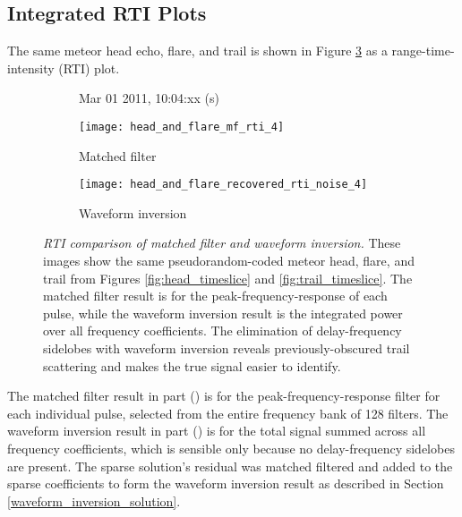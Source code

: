 \subsection{Integrated RTI Plots}
The same meteor head echo, flare, and trail is shown in Figure \ref{fig:mf_vs_recovered_rti} as a range-time-intensity (RTI) plot.
\begin{figure}[tpb]
 \vspace{-1.5\baselineskip}
 \begin{subfigure}{\textwidth}
  \centering
  \textsf{\footnotesize Mar 01 2011, 10:04:xx (s)}
  
  \texttt{[image: head\_and\_flare\_mf\_rti\_4]}
  \caption{Matched filter}
  \label{fig:example_mf_rti}
 \end{subfigure}
 
 \vspace{0.5\baselineskip}
 \begin{subfigure}{\textwidth}
  \centering
  \texttt{[image: head\_and\_flare\_recovered\_rti\_noise\_4]}
  \caption{Waveform inversion}
  \label{fig:example_recovered_rti}
 \end{subfigure}
 \caption[RTI comparison of matched filter and waveform inversion]{\emph{RTI comparison of matched filter and waveform inversion.} These images show the same pseudorandom-coded meteor head, flare, and trail from Figures \ref{fig:head_timeslice} and \ref{fig:trail_timeslice}. The matched filter result is for the peak-frequency-response of each pulse, while the waveform inversion result is the integrated power over all frequency coefficients. The elimination of delay-frequency sidelobes with waveform inversion reveals previously-obscured trail scattering and makes the true signal easier to identify.}
 \label{fig:mf_vs_recovered_rti}
\end{figure}%
The matched filter result in part () is for the peak-frequency-response filter for each individual pulse, selected from the entire frequency bank of 128 filters. The waveform inversion result in part () is for the total signal summed across all frequency coefficients, which is sensible only because no delay-frequency sidelobes are present. The sparse solution's residual was matched filtered and added to the sparse coefficients to form the waveform inversion result as described in Section \ref{waveform_inversion_solution}.

